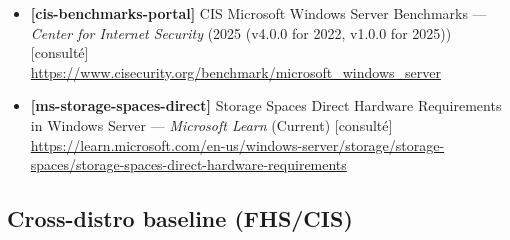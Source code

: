 \documentclass[10pt,a4paper]{article}
\begin{document}
\begin{itemize}[leftmargin=1.6em]
\item \textbf{[cis-benchmarks-portal]} CIS Microsoft Windows Server Benchmarks --- \textit{Center for Internet Security} (2025 (v4.0.0 for 2022, v1.0.0 for 2025)) \textcolor{cOk}{[consult\'e]}\\ \url{https://www.cisecurity.org/benchmark/microsoft_windows_server}
\item \textbf{[ms-storage-spaces-direct]} Storage Spaces Direct Hardware Requirements in Windows Server --- \textit{Microsoft Learn} (Current) \textcolor{cOk}{[consult\'e]}\\ \url{https://learn.microsoft.com/en-us/windows-server/storage/storage-spaces/storage-spaces-direct-hardware-requirements}
\end{itemize}
\subsection{Cross-distro baseline (FHS/CIS)}
\end{document}
